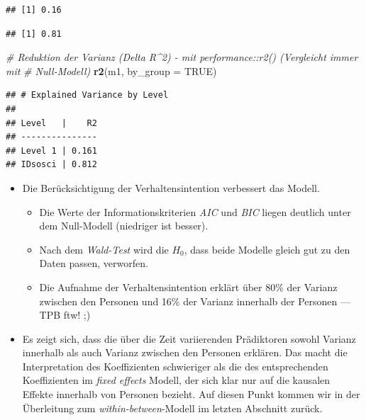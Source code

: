 \documentclass[
]{book}
\newenvironment{Shaded}{\begin{snugshade}}{\end{snugshade}}
\newcommand{\CommentTok}[1]{\textcolor[rgb]{0.56,0.35,0.01}{\textit{#1}}}
\newcommand{\DataTypeTok}[1]{\textcolor[rgb]{0.13,0.29,0.53}{#1}}
\newcommand{\DecValTok}[1]{\textcolor[rgb]{0.00,0.00,0.81}{#1}}
\newcommand{\KeywordTok}[1]{\textcolor[rgb]{0.13,0.29,0.53}{\textbf{#1}}}
\newcommand{\NormalTok}[1]{#1}
\newcommand{\OperatorTok}[1]{\textcolor[rgb]{0.81,0.36,0.00}{\textbf{#1}}}
\newcommand{\OtherTok}[1]{\textcolor[rgb]{0.56,0.35,0.01}{#1}}
\newcommand{\StringTok}[1]{\textcolor[rgb]{0.31,0.60,0.02}{#1}}
\providecommand{\tightlist}{%
  \setlength{\itemsep}{0pt}\setlength{\parskip}{0pt}}
\begin{document}
\begin{verbatim}
## [1] 0.16
\end{verbatim}

\begin{Shaded}
\end{Shaded}

\begin{verbatim}
## [1] 0.81
\end{verbatim}

\begin{Shaded}
\begin{Highlighting}[]
\CommentTok{# Reduktion der Varianz (Delta R^2) - mit performance::r2() (Vergleicht immer mit}
\CommentTok{# Null-Modell)}
\KeywordTok{r2}\NormalTok{(m1, }\DataTypeTok{by_group =} \OtherTok{TRUE}\NormalTok{)}
\end{Highlighting}
\end{Shaded}

\begin{verbatim}
## # Explained Variance by Level
## 
## Level   |    R2
## ---------------
## Level 1 | 0.161
## IDsosci | 0.812
\end{verbatim}

\begin{itemize}
\tightlist
\item
  Die Berücksichtigung der Verhaltensintention verbessert das Modell.

  \begin{itemize}
  \tightlist
  \item
    Die Werte der Informationskriterien \emph{AIC} und \emph{BIC} liegen deutlich unter dem Null-Modell (niedriger ist besser).
  \item
    Nach dem \emph{Wald-Test} wird die \(H_0\), dass beide Modelle gleich gut zu den Daten passen, verworfen.
  \item
    Die Aufnahme der Verhaltensintention erklärt über 80\% der Varianz zwischen den Personen und 16\% der Varianz innerhalb der Personen --- TPB ftw! ;)
  \end{itemize}
\item
  Es zeigt sich, dass die über die Zeit variierenden Prädiktoren sowohl Varianz innerhalb als auch Varianz zwischen den Personen erklären. Das macht die Interpretation des Koeffizienten schwieriger als die des entsprechenden Koeffizienten im \emph{fixed effects} Modell, der sich klar nur auf die kausalen Effekte innerhalb von Personen bezieht. Auf diesen Punkt kommen wir in der Überleitung zum \emph{within-between}-Modell im letzten Abschnitt zurück.
\end{itemize}
\end{document}
